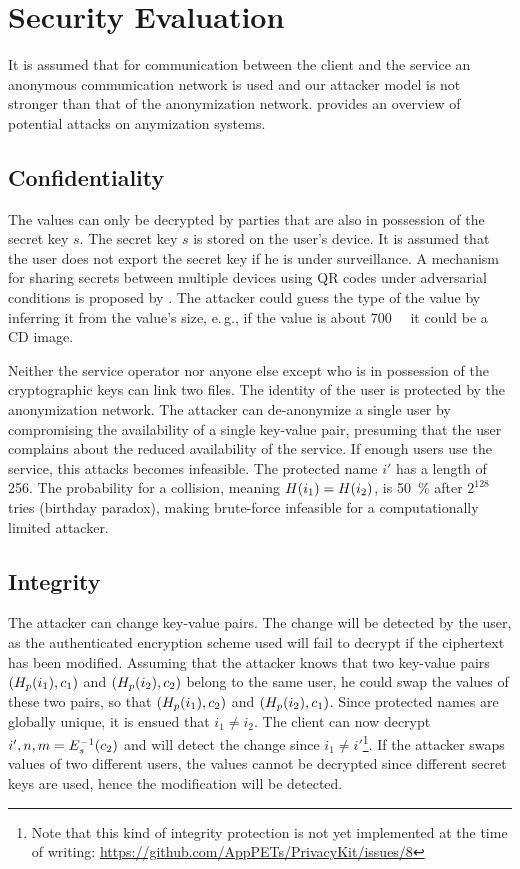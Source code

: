 \section{Security Evaluation}
It is assumed that for communication between the client and the service an anonymous communication network is used and our attacker model is not stronger than that of the anonymization network.
\textcite{DBLP:conf/diau/Raymond00} provides an overview of potential attacks on anymization systems.

\subsection{Confidentiality}
The values can only be decrypted by parties that are also in possession of the secret key $s$.
The secret key $s$ is stored on the user's device.
It is assumed that the user does not export the secret key if he is under surveillance.
A mechanism for sharing secrets between multiple devices using QR codes under adversarial conditions is proposed by \textcite{secretsharing-whitepaper}.
The attacker could guess the type of the value by inferring it from the value's size, e.\,g., if the value is about \SI{700}{\mebi\byte} it could be a CD image.

Neither the service operator nor anyone else except who is in possession of the cryptographic keys can link two files.
The identity of the user is protected by the anonymization network.
The attacker can de-anonymize a single user by compromising the availability of a single key-value pair, presuming that the user complains about the reduced availability of the service.
If enough users use the service, this attacks becomes infeasible.
The protected name $i'$ has a length of \SI{256}{\bit}.
The probability for a collision, meaning $\Function{H}{i_1} = \Function{H}{i_2}$, is \SI{50}{\percent} after $2^{128}$ tries (birthday paradox), making brute-force infeasible for a computationally limited attacker.

\subsection{Integrity}
The attacker can change key-value pairs.
The change will be detected by the user, as the authenticated encryption scheme used will fail to decrypt if the ciphertext has been modified.
Assuming that the attacker knows that two key-value pairs $\Tuple{\Function{H_p}{i_1},c_1}$ and $\Tuple{\Function{H_p}{i_2},c_2}$ belong to the same user, he could swap the values of these two pairs, so that $\Tuple{\Function{H_p}{i_1},c_2}$ and $\Tuple{\Function{H_p}{i_2},c_1}$.
Since protected names are globally unique, it is ensued that $i_1 \neq i_2$.
The client can now decrypt $i', n, m = \Function{E_s^{-1}}{c_2}$ and will detect the change since $i_1 \neq  i'$\footnote{Note that this kind of integrity protection is not yet implemented at the time of writing: \url{https://github.com/AppPETs/PrivacyKit/issues/8}}.
If the attacker swaps values of two different users, the values cannot be decrypted since different secret keys are used, hence the modification will be detected.

